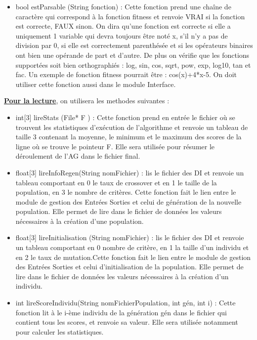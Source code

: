 \documentclass[a4paper,11pt]{article}
\begin{document}
\begin{itemize}
				\item bool estParsable (String fonction) : Cette fonction prend une chaîne de caractère qui correspond à la fonction fitness et renvoie VRAI si la fonction est correcte, FAUX sinon. On dira qu’une fonction est correcte si elle a uniquement 1 variable qui devra toujours être noté x, s’il n’y a pas de division par 0, si elle est correctement parenthésée et si les opérateurs binaires ont bien une opérande de part et d’autre. De plus on vérifie que les fonctions supportées soit bien orthographiés : log, sin, cos, sqrt, pow, exp, log10, tan et fac.  Un exemple de fonction fitness pourrait être : cos(x)+4*x-5. On doit utiliser cette fonction aussi dans le module Interface.\\
			\end{itemize}
			
			\underline{\bf Pour la lecture}, on utilisera les methodes suivantes :\\
			\begin{itemize}
				\item int[3] lireStats (File* F ) : Cette fonction prend en entrée le fichier où se trouvent les statistiques d’exécution de l’algorithme et renvoie un tableau de taille 3 contenant la moyenne, le minimum et le maximum des scores de la ligne où se trouve le pointeur F. Elle sera utilisée pour résumer le déroulement de l'AG dans le fichier final.\vspace{0.2cm}
				\item float[3] lireInfoRegen(String nomFichier) : lis le fichier des DI et renvoie un tableau comportant en 0 le taux de crossover et en 1 le taille de la population, en 3 le nombre de critères.
					Cette fonction fait le lien entre le module de gestion des Entrées Sorties et celui de génération de la nouvelle population.
					Elle permet de lire dans le fichier de données les valeurs nécessaires à la création d’une population.\vspace{0.2cm}
				\item float[3] lireInitialisation (String nomFichier) : lis le fichier des DI et renvoie un tableau comportant en 0 nombre de critère, en 1 la taille d’un individu et en 2 le taux de mutation.Cette fonction fait le lien entre le module de gestion des Entrées Sorties et celui d’initialisation de la population. 
					Elle permet de lire dans le fichier de données les valeurs nécessaires à la création d’un individu.\vspace{0.2cm}

				\item int lireScoreIndividu(String nomFichierPopulation, int gén, int i) : Cette fonction lit à le i-ème individu de la génération gén dans le fichier qui contient tous les scores, et renvoie sa valeur. Elle sera utilisée notamment pour calculer les statistiques.

			\end{itemize}
			
\end{document}
